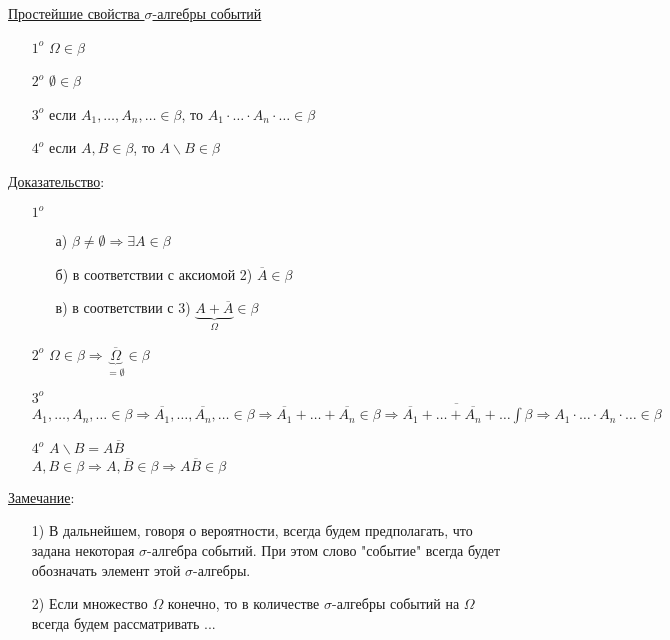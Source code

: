 \underline{Простейшие свойства $\sigma$-алгебры событий}
\begin{enumerate}
	\item[$1^o$]
	$\Omega \in \beta$ 
	
	\item[$2^o$]
	$\emptyset \in \beta$
	
	\item[$3^o$]
	если $A_1, \ldots, A_n, \ldots \in \beta$, то $A_1 \cdot \ldots \cdot A_n \cdot \ldots \in \beta$
	
	\item[$4^o$] 
	если $A,B \in \beta$, то $A \backslash B \in \beta$
\end{enumerate}

\underline{Доказательство}:
\begin{enumerate}
	\item[$1^o$]
	\begin{enumerate}
		\item[а)]
		$\beta \neq \emptyset \Rightarrow \exists A \in \beta$
		\item[б)] 
		в соответствии с аксиомой 2) $\overline{A} \in \beta$
		\item[в)]
		в соответствии с 3) $\underbrace{A + \overline{A}}_{\Omega} \in \beta$
	\end{enumerate}
	
	\item[$2^o$]
	$\Omega \in \beta \Rightarrow \underbrace{\overline{\Omega}}_{= \emptyset} \in \beta$
	
	\item[$3^o$]
	$A_1, \ldots, A_n, \ldots \in \beta \Rightarrow \overline{A_1}, \ldots , \overline{A_n}, \ldots \in \beta \Rightarrow 
	\overline{A_1} + \ldots + \overline{A_n} \in \beta \Rightarrow
	\overline{\overline{A_1} + \ldots + \overline{A_n} + \ldots} \int \beta \Rightarrow 
	A_1 \cdot \ldots \cdot A_n \cdot \ldots \in \beta$
	
	\item[$4^o$]
	$A \backslash B = A \overline{B}$ \\
	$A, B \in \beta \Rightarrow A, \overline{B} \in \beta \Rightarrow A \overline{B} \in \beta$
\end{enumerate}

\underline{Замечание}: 
\begin{enumerate}
	\item[1)]
	В дальнейшем, говоря о вероятности, всегда будем предполагать, что задана некоторая $\sigma$-алгебра событий. При этом слово "событие" всегда будет обозначать элемент этой $\sigma$-алгебры.
	
	\item[2)]
	Если множество $\Omega$ конечно, то в количестве $\sigma$-алгебры событий на $\Omega$ всегда будем рассматривать ...
\end{enumerate}




















